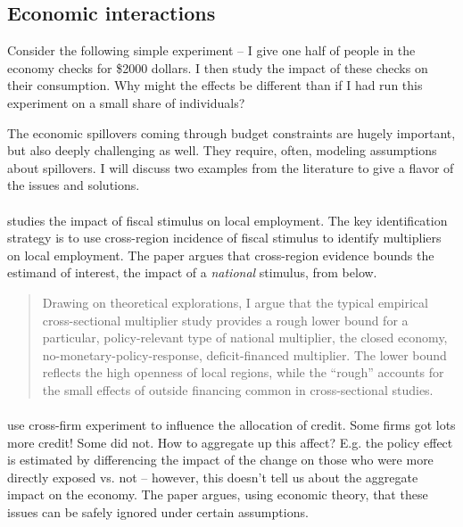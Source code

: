 \documentclass{tufte-handout}
\theoremstyle{break}
\begin{document}
\subsection{Economic interactions}
Consider the following simple experiment -- I give one half of people in the economy checks for \$2000 dollars. I then study the impact of these checks on their consumption. Why might the effects be different than if I had run this experiment on a small share of individuals?

The economic spillovers coming through budget constraints are hugely important, but also deeply challenging as well. They require, often, modeling assumptions about spillovers. I will discuss two examples from the literature to give a flavor of the issues and solutions.

\paragraph{\citet{chodorow2019geographic}} studies the impact of fiscal stimulus on local employment. The key identification strategy is to use cross-region incidence of fiscal stimulus to identify multipliers on local employment. The paper argues that cross-region evidence bounds the estimand of interest, the impact of a \emph{national} stimulus, from below.

\begin{fullwidth}
  \begin{quote}
    Drawing on theoretical explorations, I argue that the typical empirical cross-sectional multiplier study provides a rough lower bound for a particular, policy-relevant type of national multiplier, the closed economy, no-monetary-policy-response, deficit-financed multiplier. The lower bound reflects the high openness of local regions, while the ``rough'' accounts for the small effects of outside financing common in cross-sectional studies.
  \end{quote}
\end{fullwidth}


\paragraph{\citet{sraer2023use}} use cross-firm experiment to influence the allocation of credit. Some firms got lots more credit! Some did not. How to aggregate up this affect? E.g. the policy effect is estimated by differencing the impact of the change on those who were more directly exposed vs. not -- however, this doesn't tell us about the aggregate impact on the economy. The paper argues, using economic theory, that these issues can be safely ignored under certain assumptions.
\end{document}
